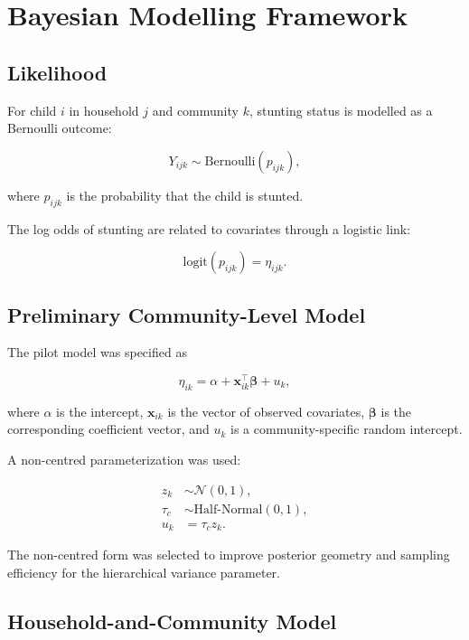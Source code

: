 \section{Bayesian Modelling Framework}

\subsection{Likelihood}

For child $i$ in household $j$ and community $k$, stunting status is modelled as a Bernoulli outcome:

\begin{equation}
Y_{ijk} \sim \text{Bernoulli}(p_{ijk}),
\end{equation}

where $p_{ijk}$ is the probability that the child is stunted.

The log odds of stunting are related to covariates through a logistic link:

\begin{equation}
\text{logit}(p_{ijk}) = \eta_{ijk}.
\end{equation}

\subsection{Preliminary Community-Level Model}

The pilot model was specified as

\begin{equation}
\eta_{ik}
=
\alpha
+
\mathbf{x}_{ik}^{\top}\boldsymbol{\beta}
+
u_k,
\end{equation}

where $\alpha$ is the intercept, $\mathbf{x}_{ik}$ is the vector of observed covariates, $\boldsymbol{\beta}$ is the corresponding coefficient vector, and $u_k$ is a community-specific random intercept.

A non-centred parameterization was used:

\begin{align}
z_k &\sim \mathcal{N}(0,1), \\
\tau_c &\sim \text{Half-Normal}(0,1), \\
u_k &= \tau_c z_k.
\end{align}

The non-centred form was selected to improve posterior geometry and sampling efficiency for the hierarchical variance parameter.

\subsection{Household-and-Community Model}

